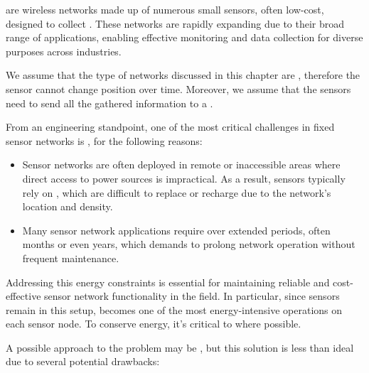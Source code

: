 \documentclass[a4paper, 12pt]{report}
\begin{document}
     are wireless networks made up of numerous small sensors, often low-cost, designed to collect . These networks are rapidly expanding due to their broad range of applications, enabling effective monitoring and data collection for diverse purposes across industries.

    We assume that the type of networks discussed in this chapter are , therefore the sensor cannot change position over time. Moreover, we assume that the sensors need to send all the gathered information to a .
    
    From an engineering standpoint, one of the most critical challenges in fixed sensor networks is , for the following reasons:

    \begin{itemize}
        \item Sensor networks are often deployed in remote or inaccessible areas where direct access to power sources is impractical. As a result, sensors typically rely on , which are difficult to replace or recharge due to the network's location and density.
        \item Many sensor network applications require  over extended periods, often months or even years, which demands  to prolong network operation without frequent maintenance.
    \end{itemize}

     Addressing this energy constraints is essential for maintaining reliable and cost-effective sensor network functionality in the field. In particular, since sensors remain  in this setup,  becomes one of the most energy-intensive operations on each sensor node. To conserve energy, it's critical to  where possible.

     A possible approach to the problem may be , but this solution is less than ideal due to several potential drawbacks:
\end{document}
